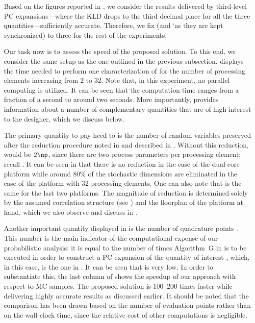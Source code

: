 Based on the figures reported in , we consider
the results delivered by third-level \ac{PC} expansions---where the \ac{KLD}
drops to the third decimal place for all the three quantities---sufficiently
accurate. Therefore, we fix \lc (and \lq as they are kept synchronized) to three
for the rest of the experiments.


Our task now is to assess the speed of the proposed solution. To this end, we
consider the same setup as the one outlined in the previous subsection.
 displays the time needed to perform one
characterization of \vg for the number of processing elements \np increasing
from 2 to 32. Note that, in this experiment, no parallel computing is utilized.
It can be seen that the computation time ranges from a fraction of a second to
around two seconds. More importantly,  provides
information about a number of complementary quantities that are of high interest
to the designer, which we discuss below.

The primary quantity to pay heed to is the number of random variables \nz
preserved after the reduction procedure noted in  and
described in . Without this reduction, \nz
would be $2 \np$, since there are two process parameters per processing element;
recall . It can be seen in
 that there is no reduction in the case of the
dual-core platform while around 80\% of the stochastic dimensions are eliminated
in the case of the platform with 32 processing elements. One can also note that
\nz is the same for the last two platforms. The magnitude of reduction is
determined solely by the assumed correlation structure (see
) and the floorplan of the platform at
hand, which we also observe and discuss in .

Another important quantity displayed in  is the
number of quadrature points \nq. This number is the main indicator of the
computational expense of our probabilistic analysis: it is equal to the number
of times Algorithm~G in  is to be executed in order to
construct a \ac{PC} expansion of the quantity of interest \g, which, in this
case, is the one in . It can be seen that \nq
is very low. In order to substantiate this, the last column of
 shows the speedup of our approach with respect
to  \ac{MC} samples. The proposed solution is 100--200 times faster
while delivering highly accurate results as discussed earlier. It should be
noted that the comparison has been drawn based on the number of evaluation
points rather than on the wall-clock time, since the relative cost of other
computations is negligible.

